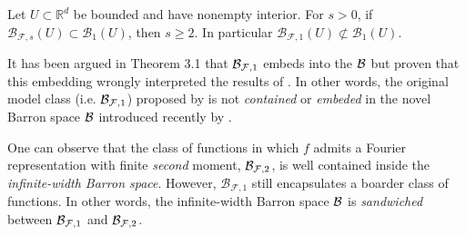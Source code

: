 \begin{proposition}

    Let $U \subset \mathbb{R}^d$ be bounded and have nonempty interior. For
    $s>0$, if $\mathcal{B}_{\mathcal{F},s}(U) \subset \mathcal{B}_{1}(U)$, then
    $s \geq 2$. In particular $\mathcal{B}_{\mathcal{F},1}(U) \not\subset
    \mathcal{B}_{1}(U)$.
\end{proposition}

\begin{remark}

    It has been argued in Theorem 3.1 \cite[p.
    12]{eRepresentationFormulasPointwise2020} that $\mathcal{B}_{\mathcal{F},1}$ embeds
    into the $\mathcal{B}$ but \cite{carageaNeuralNetworkApproximation2022} proven
    that this embedding wrongly interpreted the results of
    \cite{barronUniversalApproximationBounds1993,barronNeuralNetApproximation1992}.
    In other words, the original model class (i.e. $\mathcal{B}_{\mathcal{F},1}$)
    proposed by \cite{barronNeuralNetApproximation1992} is not
    \textit{contained} or \textit{embeded} in the novel Barron space $\mathcal{B}$
    introduced recently by \cite{eBarronSpaceFlowinduced2021}. 
    

    One can observe that the class of functions in which $f$ admits a Fourier
    representation with finite \textit{second} moment, $\mathcal{B}_{\mathcal{F}, 2}$,
    is well contained inside the \textit{infinite-width Barron space}. However,
    $\mathcal{B}_{\mathcal{F}, 1}$ still encapsulates a boarder class of
    functions. In other words, the infinite-width Barron space $\mathcal{B}$ is
    \textit{sandwiched} between $\mathcal{B}_{\mathcal{F}, 1}$ and $\mathcal{B}_{\mathcal{F},
    2}$.
\end{remark}


